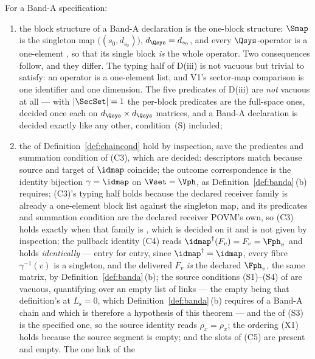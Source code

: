 \begin{theorem}\label{thm:band-a}
For a Band-A specification:
\begin{enumerate}[label=(\roman*),leftmargin=2.2em]
\item the block structure of a Band-A declaration is the one-block structure:
$\Smap$ is the singleton map $\big((s_0,d_{s_0})\big)$, $d_{\Qsys}=d_{s_0}$,
and every $\Qsys$-operator is a one-element , so that its
single block \emph{is} the whole operator. Two consequences follow, and they
differ. The typing half of D(iii) is not vacuous but trivial to satisfy: an
operator is a one-element list, and V1's sector-map comparison is one
identifier and one dimension. The five predicates of D(iii) are \emph{not}
vacuous at all --- with $|\SecSet|=1$ the per-block predicates are the
full-space ones, decided once each on $d_{\Qsys}\times d_{\Qsys}$ matrices, and
a Band-A declaration is decided exactly like any other, condition~(S)
included;
\item the  of
Definition~\ref{def:chaincond} hold by inspection, save the predicates and
summation condition of (C3), which are decided: descriptors match because
source and target of $\idmap$ coincide; the outcome correspondence is the
identity bijection $\gamma=\idmap$ on $\Vset=\Vph$, as
Definition~\ref{def:banda}\,(b) requires; (C3)'s typing half holds
because the declared receiver family is already a one-element block list
against the singleton map, and its predicates and summation condition are the
declared receiver POVM's own, so (C3) holds exactly when that family is
, which is decided on it and is not given by
inspection; the pullback identity (C4) reads
$\idmap^{\dagger}(F_v)=F_v=\Fph_v$ and holds \emph{identically} --- entry for
entry, since $\idmap^{\dagger}=\idmap$, every fibre $\gamma^{-1}(v)$ is a
singleton, and the delivered $F_v$ \emph{is} the declared $\Fph_v$, the same
matrix, by Definition~\ref{def:banda}\,(b); the source conditions (S1)--(S4) of
 are vacuous, quantifying over an empty
list of links --- the empty  being that definition's at
$L_{\mathrm s}=0$, which Definition~\ref{def:banda}\,(b) requires of a Band-A
chain and which is therefore a hypothesis of this theorem --- and the
 of (S3) is the specified one, so the source identity
reads $\rho_x=\rho_x$; the ordering (X1) holds because the source segment is
empty; and the slots of (C5) are present and empty. The one link of the

\end{enumerate}
\end{theorem}
